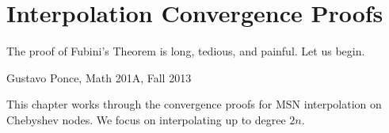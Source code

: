 \chapter{Interpolation Convergence Proofs}
\label{chap:cvip_converge}
\epigraph{The proof of Fubini's Theorem is long, tedious, and painful.
    Let us begin.}{Gustavo Ponce, Math 201A, Fall 2013}

This chapter works through the convergence proofs for MSN interpolation on
Chebyshev nodes. We focus on interpolating up to degree $2n$.























